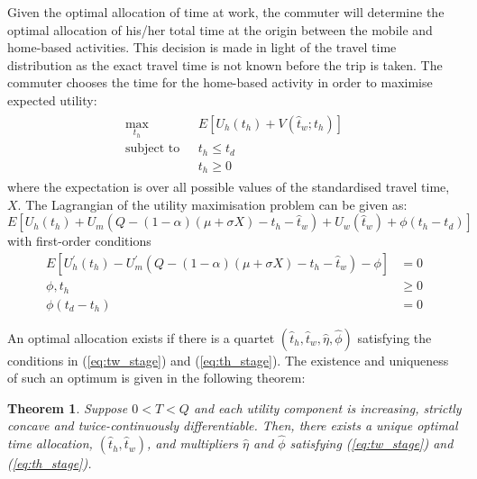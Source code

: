 \documentclass[12pt,a4paper,british]{article}
\newtheorem{theorem}{Theorem}[section]
\begin{document}
Given the optimal allocation of time at work, the commuter will determine the optimal allocation of his/her total time at the origin between the mobile and home-based activities. This decision is made in light of the travel time distribution as the exact travel time is not known before the trip is taken. The commuter chooses the time for the home-based activity in order to maximise expected utility:
\begin{align}
\begin{split}
\max_{t_{h}} \quad & E\left[U_{h}\left(t_{h}\right)+V\left(\hat{t}_{w};t_{h}\right)\right]\\
\mbox{subject to } \,\, & t_{h} \leq t_{d} \\
& t_h \geq 0
\end{split}
\label{eq:firstStageProblem}
\end{align}
where the expectation is over all possible values of the standardised travel time, $X$. The Lagrangian of the utility maximisation problem can be given as: 
\begin{equation*}
E\left[U_{h}\left(t_{h}\right)+U_{m}\left(Q-\left(1-\alpha\right)\left(\mu+\sigma X\right)-t_{h}-\hat{t}_{w}\right)+U_{w}\left(\hat{t}_{w}\right)+\phi\left(t_{h}-t_{d}\right)\right]
\end{equation*}
with first-order conditions
\begin{subequations}\label{eq:th_stage}
\begin{align}
E\left[U_{h}^{\prime}\left(t_{h}\right)-U_{m}^{\prime}\left(Q-\left(1-\alpha\right)\left(\mu+\sigma X\right)-t_{h}-\hat{t}_{w}\right)-\phi\right] & =0
\label{eq:stage1_wrt_th}\\
\phi,t_{h} & \geq 0 
\label{eq:stage1_lambda}\\
\phi\left(t_{d}-t_{h}\right) & =0
\label{eq:stage1_lambdai_const}
\end{align}
\end{subequations}

An optimal allocation exists if there is a quartet $\left(\hat{t}_{h},\hat{t}_{w},\hat{\eta},\hat{\phi}\right)$ satisfying the conditions in (\ref{eq:tw_stage}) and (\ref{eq:th_stage}). The existence and uniqueness of such an optimum is given in the following theorem:
\begin{theorem}
\label{thm:existence_stochastic}
Suppose $0<T<Q$ and each utility component is increasing, strictly concave and twice-continuously differentiable. Then, there exists a unique optimal time allocation, $\left(\hat{t}_{h},\hat{t}_{w}\right)$, and multipliers $\hat{\eta}$ and $\hat{\phi}$ satisfying (\ref{eq:tw_stage}) and (\ref{eq:th_stage}).
\end{theorem}
\end{document}
